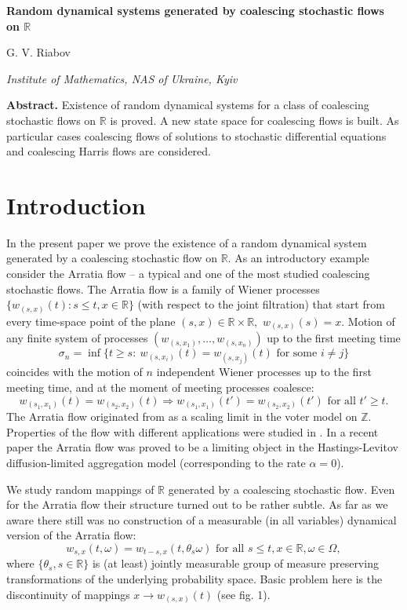 \documentclass[a4paper,12pt]{article}
\newcommand{\1}{1\!\!\,{\rm I}}
\theoremstyle{plain}
\begin{document}
	\begin{center}
	{\Large\bf Random dynamical systems generated by coalescing stochastic flows on $\mathbb{R}$}
	
\vskip10pt

G. V. Riabov

\vskip10pt

{\it Institute of Mathematics, NAS of Ukraine, Kyiv}
		\end{center}
		
	\vskip30pt

{\bf Abstract.} Existence of random dynamical systems for a class of coalescing stochastic flows on $\mathbb{R}$ is proved. A new state space for coalescing flows is built. As particular cases coalescing flows of solutions to stochastic differential equations and coalescing Harris flows are considered.


\section{Introduction}	

In the present paper we prove the existence of a random dynamical system generated by a coalescing stochastic flow on $\mathbb{R}.$ As an introductory example consider the Arratia flow -- a typical and one of the most studied coalescing stochastic flows. The Arratia flow is a family of Wiener processes $\{w_{(s,x)}(t):s\leq t, x\in \mathbb{R}\}$ (with respect to the joint filtration) that start from every time-space point of the plane $(s,x)\in \mathbb{R}\times \mathbb{R},$ $w_{(s,x)}(s)=x.$ Motion of any finite system of processes $(w_{(s,x_1)},\ldots,w_{(s,x_n)})$ up to the first meeting time 
$$
\sigma_n=\inf\{t\geq s: \ w_{(s,x_i)}(t)=w_{(s,x_j)}(t) \mbox{ for some } i\ne j \}
$$
coincides with the motion of $n$ independent Wiener processes up to the first meeting time, and at the moment of meeting processes coalesce:
$$
w_{(s_1,x_1)}(t)=w_{(s_2,x_2)}(t) \Rightarrow w_{(s_1,x_1)}(t')=w_{(s_2,x_2)}(t') \mbox{ for all } t'\geq t.
$$
The Arratia flow originated from \cite{Arratia, Arratia2} as a scaling limit in the voter model on $\mathbb{Z}$. Properties of the flow with different applications were studied in \cite{LJR, Darling, Harris, FINR, SSS, D1, TW}. In a recent paper \cite{NT} the Arratia flow was proved to be a limiting object in the Hastings-Levitov diffusion-limited aggregation model (corresponding to the rate $\alpha=0$).



We study random mappings of $\mathbb{R}$ generated by a coalescing stochastic flow. Even for the Arratia flow their structure turned out to be rather subtle. As far as we aware there still was no construction of a measurable (in all variables) dynamical version of the Arratia flow:
$$
w_{s,x}(t,\omega)=w_{t-s,x}(t,\theta_s \omega) \mbox{ for all } s\leq t, x\in \mathbb{R}, \omega\in \Omega,
$$
where $\{\theta_s,s\in\mathbb{R}\}$ is (at least) jointly measurable group of measure preserving transformations of the underlying probability space. 
Basic problem here is the discontinuity of mappings $x\to w_{(s,x)}(t)$  (see fig. 1).
\end{document}
